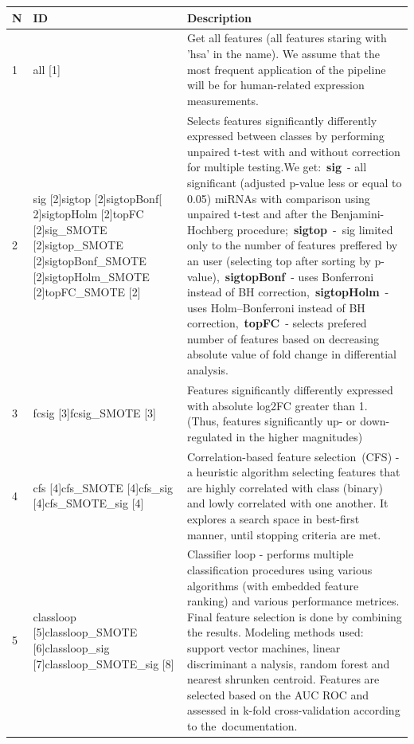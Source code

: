 \documentclass[article]{jss}
\begin{document}
\begin{tabular}{|p{0.2in}|p{2.0in}|p{3.9in}|} \hline
\textbf{N} & \textbf{ID} & \textbf{Description} \\ \hline
1 & all [1] & Get all features (all features staring with 'hsa' in the name). We assume that the most frequent application of the pipeline will be for human-related expression measurements. \\ \hline
2 & sig [2]sigtop [2]sigtopBonf[ 2]sigtopHolm [2]topFC [2]sig\_SMOTE [2]sigtop\_SMOTE [2]sigtopBonf\_SMOTE [2]sigtopHolm\_SMOTE [2]topFC\_SMOTE [2] & Selects features significantly differently expressed between classes by performing unpaired t-test with and without correction for multiple testing.We get:~\textbf{sig}~- all significant (adjusted p-value less or equal to 0.05) miRNAs with comparison using unpaired t-test and after the Benjamini-Hochberg procedure;~\textbf{sigtop}~-~sig limited only to the number of features preffered by an user (selecting top after sorting by p-value),~\textbf{sigtopBonf}~- uses Bonferroni instead of BH correction,~\textbf{sigtopHolm}~- uses Holm--Bonferroni instead of BH correction,~\textbf{topFC}~- selects prefered number of features based on decreasing absolute value of fold change in differential analysis. \\ \hline
3 & fcsig [3]fcsig\_SMOTE [3] & Features significantly differently expressed with absolute log2FC greater than 1. (Thus, features significantly up- or down-regulated in the higher magnitudes)  \\ \hline
4 & cfs [4]cfs\_SMOTE [4]cfs\_sig [4]cfs\_SMOTE\_sig [4] & Correlation-based feature selection~(CFS) - a heuristic algorithm selecting features that are highly correlated with class (binary) and lowly correlated with one another. It explores a search space in best-first manner, until stopping criteria are met. \\ \hline
5 & classloop [5]\newline classloop\_SMOTE [6]\newline classloop\_sig [7]\newline classloop\_SMOTE\_sig [8] & Classifier loop - performs multiple classification procedures using various algorithms (with embedded feature ranking) and various performance metrices. Final feature selection is done by combining the results. Modeling methods used: support vector machines, linear discriminant a nalysis, random forest and nearest shrunken centroid. Features are selected based on the AUC ROC and assessed in k-fold cross-validation according to the~documentation.  \\ \hline

\end{tabular}
\end{document}
